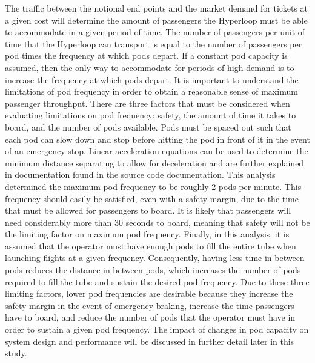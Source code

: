 The traffic between the notional end points and the market demand for tickets
at a given cost will determine the amount of passengers the Hyperloop must be
able to accommodate in a given period of time. The number of passengers per
unit of time that the Hyperloop can transport is equal to the number of
passengers per pod times the frequency at which pods depart. If a constant pod
capacity is assumed, then the only way to accommodate for periods of high
demand is to increase the frequency at which pods depart. It is important to
understand the limitations of pod frequency in order to obtain a reasonable
sense of maximum passenger throughput. There are three factors that must be
considered when evaluating limitations on pod frequency: safety, the amount of
time it takes to board, and the number of pods available. Pods must be spaced
out such that each pod can slow down and stop before hitting the pod in front
of it in the event of an emergency stop. Linear acceleration equations can be
used to determine the minimum distance separating to allow for deceleration
and are further explained in documentation found in the source code
documentation. This analysis determined the maximum pod frequency to be
roughly 2 pods per minute. This frequency should easily be satisfied, even
with a safety margin, due to the time that must be allowed for passengers to
board. It is likely that passengers will need considerably more than 30
seconds to board, meaning that safety will not be the limiting factor on
maximum pod frequency. Finally, in this analysis, it is assumed that the
operator must have enough pods to fill the entire tube when launching flights
at a given frequency. Consequently, having less time in between pods reduces
the distance in between pods, which increases the number of pods required to
fill the tube and sustain the desired pod frequency. Due to these three
limiting factors, lower pod frequencies are desirable because they increase
the safety margin in the event of emergency braking, increase the time
passengers have to board, and reduce the number of pods that the operator must
have in order to sustain a given pod frequency. The impact of changes in pod
capacity on system design and performance will be discussed in further detail
later in this study.
